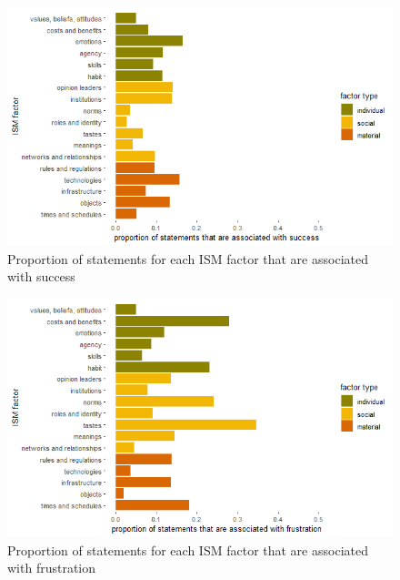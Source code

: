 \begin{figure}[!ht]
    \centering
    \includegraphics[width=1\linewidth]{figures/statements_associated_with_success.png}
    \caption{Proportion of statements for each ISM factor that are associated with success}
    \label{fig:ismsuccess}
\end{figure}

\begin{figure}[!ht]
    \centering
    \includegraphics[width=1\linewidth]{figures/statements_associated_with_frustration.png}
    \caption{Proportion of statements for each ISM factor that are associated with frustration}
    \label{fig:ismfrustration}
\end{figure}

